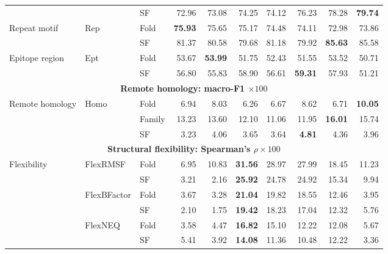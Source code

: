 \begin{table}[p]
{\begin{tabular}{@{}lllrr@{\hspace{6pt}}rrrrr@{}}
 &  & SF & 72.96 & 73.08 & 74.25 & 74.12 & 76.23 & 78.28 & \textbf{79.74} \\
\multirow{2}{*}{Repeat motif} & \multirow{2}{*}{Rep} & Fold & \textbf{75.93} & 75.65 & 75.17 & 74.48 & 74.11 & 72.98 & 73.86 \\
 &  & SF & 81.37 & 80.58 & 79.68 & 81.18 & 79.92 & \textbf{85.63} & 85.58 \\
\multirow{2}{*}{Epitope region} & \multirow{2}{*}{Ept} & Fold & 53.67 & \textbf{53.99} & 51.75 & 52.43 & 51.55 & 53.52 & 50.71 \\
 &  & SF & 56.80 & 55.83 & 58.90 & 56.61 & \textbf{59.31} & 57.93 & 51.21 \\
\midrule
\multicolumn{10}{c}{\textbf{Remote homology: macro-F1 $\times100$}} \\
\midrule
\multirow{3}{*}{Remote homology} & \multirow{3}{*}{Homo} & Fold & 6.94 & 8.03 & 6.26 & 6.67 & 8.62 & 6.71 & \textbf{10.05} \\
 &  & Family & 13.23 & 13.60 & 12.10 & 11.06 & 11.95 & \textbf{16.01} & 15.74 \\
 &  & SF & 3.23 & 4.06 & 3.65 & 3.64 & \textbf{4.81} & 4.36 & 3.96 \\
\midrule
\multicolumn{10}{c}{\textbf{Structural flexibility: Spearman's $\rho\times100$}} \\
\midrule
\multirow{6}{*}{Flexibility} & \multirow{2}{*}{FlexRMSF} & Fold & 6.95 & 10.83 & \textbf{31.56} & 28.97 & 27.99 & 18.45 & 11.23 \\
 &  & SF & 3.21 & 2.16 & \textbf{25.92} & 24.78 & 24.92 & 15.34 & 9.94 \\
 & \multirow{2}{*}{FlexBFactor} & Fold & 3.67 & 3.28 & \textbf{21.04} & 19.82 & 18.55 & 12.46 & 3.95 \\
 &  & SF & 2.10 & 1.75 & \textbf{19.42} & 18.23 & 17.04 & 12.32 & 5.76 \\
 & \multirow{2}{*}{FlexNEQ} & Fold & 3.58 & 4.47 & \textbf{16.82} & 15.10 & 12.22 & 12.08 & 5.67 \\
 &  & SF & 5.41 & 3.92 & \textbf{14.08} & 11.36 & 10.48 & 12.22 & 3.36 \\
\bottomrule
\end{tabular}%
}
\stbworkshopfit
\end{table}

